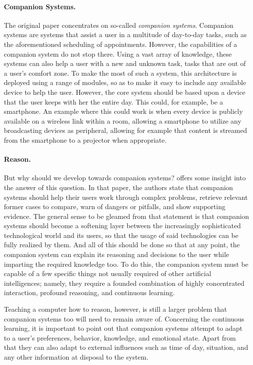 \documentclass[a4paper]{article}
\begin{document}
\paragraph{Companion Systems.} The original paper concentrates on so-called {\it companion systems}. Companion systems are systems that assist a user in a multitude of day-to-day tasks, such as the aforementioned scheduling of appointments. However, the capabilities of a companion system do not stop there. Using a vast array of knowledge, these systems can also help a user with a new and unknown task, tasks that are out of a user's comfort zone. To make the most of such a system, this architecture is deployed using a range of modules, so as to make it easy to include any available device to help the user. However, the core system should be based upon a device that the user keeps with her the entire day. This could, for example, be a smartphone. An example where this could work is when every device is publicly available on a wireless link within a room, allowing a smartphone to utilize any broadcasting devices as peripheral, allowing for example that content is streamed from the smartphone to a projector when appropriate.

\paragraph{Reason.} But why should we develop towards companion systems? \cite{forbus2006companion} offers some insight into the answer of this question. In that paper, the authors state that companion systems should help their users work through complex problems, retrieve relevant former cases to compare, warn of dangers or pitfalls, and show supporting evidence. The general sense to be gleamed from that statement is that companion systems should become a softening layer between the increasingly sophisticated technological world and its users, so that the usage of said technologies can be fully realized by them. And all of this should be done so that at any point, the companion system can explain its reasoning and decisions to the user while imparting the required knowledge too. To do this, the companion system must be capable of a few specific things not usually required of other artificial intelligences; namely, they require a founded combination of highly concentrated interaction, profound reasoning, and continuous learning.

Teaching a computer how to reason, however, is still a larger problem that companion systems too will need to remain aware of. Concerning the continuous learning, it is important to point out that companion systems attempt to adapt to a user's preferences, behavior, knowledge, and emotional state. Apart from that they can also adapt to external influences such as time of day, situation, and any other information at disposal to the system.
\end{document}

